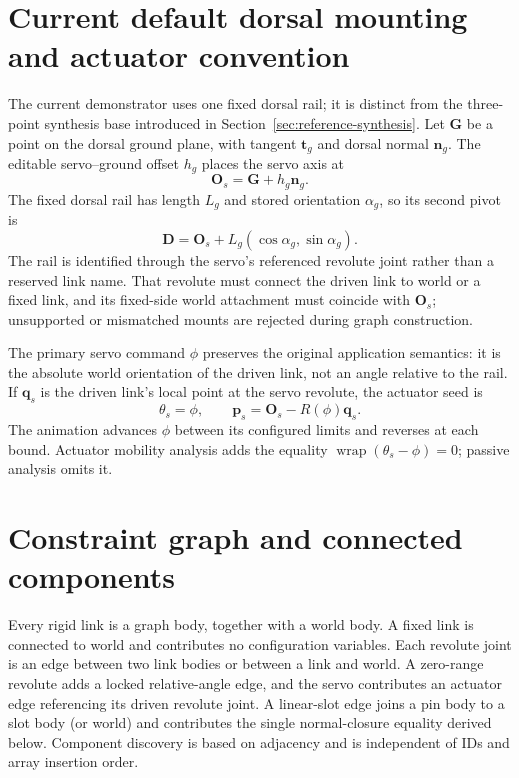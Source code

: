 \documentclass[11pt]{article}
\begin{document}
\section{Current default dorsal mounting and actuator convention}

The current demonstrator uses one fixed dorsal rail; it is distinct from the
three-point synthesis base introduced in Section~\ref{sec:reference-synthesis}.
Let $\mathbf{G}$ be a point on the dorsal ground plane, with tangent
$\mathbf{t}_g$ and dorsal normal $\mathbf{n}_g$. The editable servo--ground
offset $h_g$ places the servo axis at
\begin{equation}
  \mathbf{O}_s=\mathbf{G}+h_g\mathbf{n}_g.
\end{equation}
The fixed dorsal rail has length $L_g$ and stored orientation $\alpha_g$, so its
second pivot is
\begin{equation}
  \mathbf{D}=\mathbf{O}_s+L_g(\cos\alpha_g,\sin\alpha_g).
\end{equation}
The rail is identified through the servo's referenced revolute joint rather
than a reserved link name. That revolute must connect the driven link to world
or a fixed link, and its fixed-side world attachment must coincide with
$\mathbf{O}_s$; unsupported or mismatched mounts are rejected during graph
construction.

The primary servo command $\phi$ preserves the original application semantics:
it is the absolute world orientation of the driven link, not an angle relative
to the rail. If $\mathbf{q}_s$ is the driven link's local point at the servo
revolute, the actuator seed is
\begin{equation}
  \theta_s=\phi, \qquad
  \mathbf{p}_s=\mathbf{O}_s-R(\phi)\mathbf{q}_s.
\end{equation}
The animation advances $\phi$ between its configured limits and reverses at
each bound. Actuator mobility analysis adds the equality
$\operatorname{wrap}(\theta_s-\phi)=0$; passive analysis omits it.

\section{Constraint graph and connected components}

Every rigid link is a graph body, together with a world body. A fixed link is
connected to world and contributes no configuration variables. Each revolute
joint is an edge between two link bodies or between a link and world. A
zero-range revolute adds a locked relative-angle edge, and the servo contributes
an actuator edge referencing its driven revolute joint. A linear-slot edge joins
a pin body to a slot body (or world) and contributes the single normal-closure
equality derived below. Component discovery is based on adjacency and is
independent of IDs and array insertion order.
\end{document}
